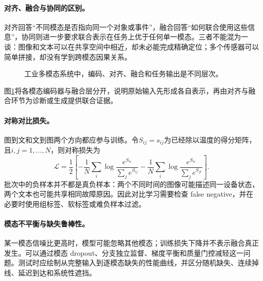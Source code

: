 \paragraph{对齐、融合与协同的区别。}
对齐回答“不同模态是否指向同一个对象或事件”，融合回答“如何联合使用这些信息”，协同则进一步要求联合表示在任务上优于任何单一模态。三者不能混为一谈：图像和文本可以在共享空间中相近，却未必能完成精确定位；多个传感器可以简单拼接，却没有学到跨模态因果关系。

\begin{figure}[htbp]
\centering
{}
\caption{工业多模态系统中，编码、对齐、融合和任务输出是不同层次。}
\label{fig:multimodal-industrial-fusion}
\end{figure}
图\ref{fig:multimodal-industrial-fusion}将各模态编码器与融合层分开，说明原始输入先形成各自表示，再由对齐与融合环节为诊断或生成提供联合证据。

\paragraph{对称对比损失。}
图到文和文到图两个方向都应参与训练。令$S_{ij}=s_{ij}$为已经除以温度的得分矩阵，且$i,j=1,\ldots,N$，则对称损失为
\begin{equation}
 \mathcal{L}=\frac12\left[-\frac1N\sum_i\log\frac{e^{S_{ii}}}{\sum_j e^{S_{ij}}}
 -\frac1N\sum_i\log\frac{e^{S_{ii}}}{\sum_j e^{S_{ji}}}\right].
\end{equation}
批次中的负样本并不都是真负样本：两个不同时间的图像可能描述同一设备状态，两个文本也可能共享相同故障原因。因此对比学习需要检查 false negative，并在必要时使用组标签、软标签或难负样本过滤。

\paragraph{模态不平衡与缺失鲁棒性。}
某一模态信噪比更高时，模型可能忽略其他模态；训练损失下降并不表示融合真正发生。可以通过模态 dropout、分支独立监督、梯度平衡和质量门控减轻这一问题。测试时应绘制从完整输入到逐模态缺失的性能曲线，并区分随机缺失、连续掉线、延迟到达和系统性遮挡。

